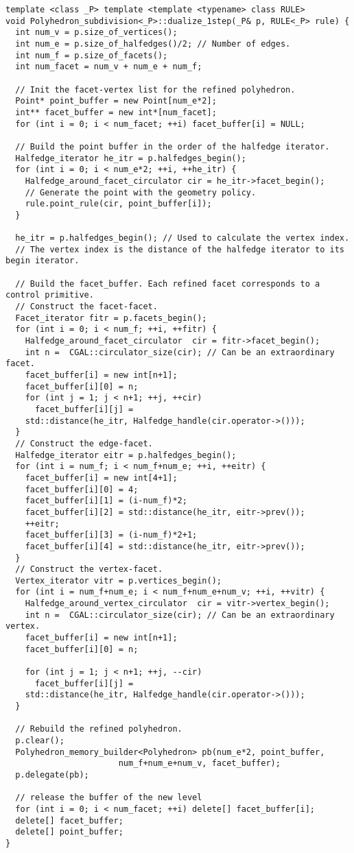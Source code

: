 \begin{lstlisting}
template <class _P> template <template <typename> class RULE>
void Polyhedron_subdivision<_P>::dualize_1step(_P& p, RULE<_P> rule) {
  int num_v = p.size_of_vertices();
  int num_e = p.size_of_halfedges()/2; // Number of edges.
  int num_f = p.size_of_facets();
  int num_facet = num_v + num_e + num_f;
  
  // Init the facet-vertex list for the refined polyhedron.
  Point* point_buffer = new Point[num_e*2];
  int** facet_buffer = new int*[num_facet];
  for (int i = 0; i < num_facet; ++i) facet_buffer[i] = NULL;

  // Build the point buffer in the order of the halfedge iterator.
  Halfedge_iterator he_itr = p.halfedges_begin(); 
  for (int i = 0; i < num_e*2; ++i, ++he_itr) {
    Halfedge_around_facet_circulator cir = he_itr->facet_begin();
    // Generate the point with the geometry policy.
    rule.point_rule(cir, point_buffer[i]);
  }

  he_itr = p.halfedges_begin(); // Used to calculate the vertex index.
  // The vertex index is the distance of the halfedge iterator to its begin iterator.
  
  // Build the facet_buffer. Each refined facet corresponds to a control primitive.
  // Construct the facet-facet.
  Facet_iterator fitr = p.facets_begin();  
  for (int i = 0; i < num_f; ++i, ++fitr) {
    Halfedge_around_facet_circulator  cir = fitr->facet_begin();
    int n =  CGAL::circulator_size(cir); // Can be an extraordinary facet.
    facet_buffer[i] = new int[n+1];
    facet_buffer[i][0] = n;
    for (int j = 1; j < n+1; ++j, ++cir)
      facet_buffer[i][j] = 
	std::distance(he_itr, Halfedge_handle(cir.operator->())); 
  }
  // Construct the edge-facet.
  Halfedge_iterator eitr = p.halfedges_begin();
  for (int i = num_f; i < num_f+num_e; ++i, ++eitr) {
    facet_buffer[i] = new int[4+1];
    facet_buffer[i][0] = 4;
    facet_buffer[i][1] = (i-num_f)*2;
    facet_buffer[i][2] = std::distance(he_itr, eitr->prev());    
    ++eitr;
    facet_buffer[i][3] = (i-num_f)*2+1; 
    facet_buffer[i][4] = std::distance(he_itr, eitr->prev());    
  }
  // Construct the vertex-facet.
  Vertex_iterator vitr = p.vertices_begin();
  for (int i = num_f+num_e; i < num_f+num_e+num_v; ++i, ++vitr) {
    Halfedge_around_vertex_circulator  cir = vitr->vertex_begin();
    int n =  CGAL::circulator_size(cir); // Can be an extraordinary vertex.
    facet_buffer[i] = new int[n+1];
    facet_buffer[i][0] = n;

    for (int j = 1; j < n+1; ++j, --cir)
      facet_buffer[i][j] = 
	std::distance(he_itr, Halfedge_handle(cir.operator->())); 
  }
  
  // Rebuild the refined polyhedron. 
  p.clear();
  Polyhedron_memory_builder<Polyhedron> pb(num_e*2, point_buffer, 
					   num_f+num_e+num_v, facet_buffer);
  p.delegate(pb);
  
  // release the buffer of the new level
  for (int i = 0; i < num_facet; ++i) delete[] facet_buffer[i];
  delete[] facet_buffer;
  delete[] point_buffer;
}
\end{lstlisting}
